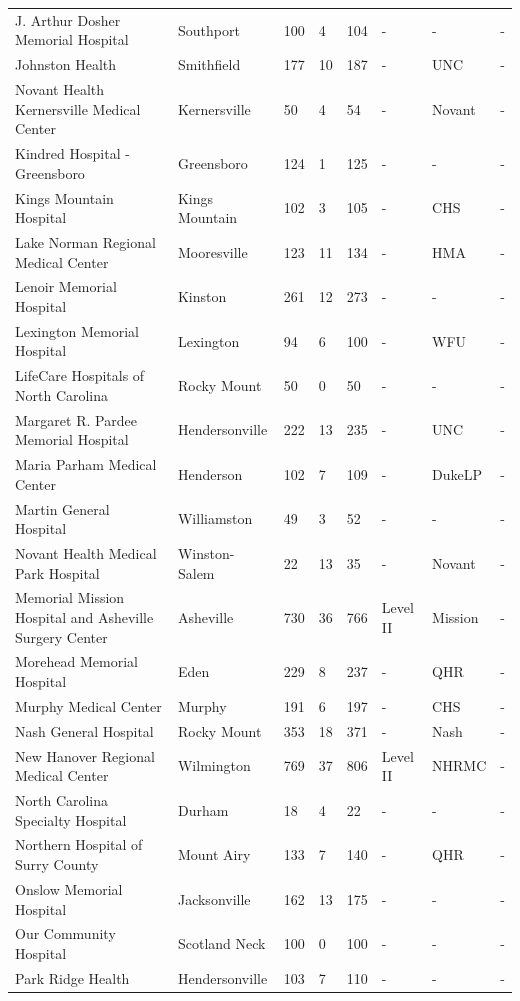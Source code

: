 \documentclass{article}
\begin{document}
\begin{tabular}{llllllll}
J. Arthur Dosher Memorial Hospital & Southport & 100 & 4 & 104 & - & - & - \\
Johnston Health & Smithfield & 177 & 10 & 187 & - & UNC & - \\
Novant Health Kernersville Medical Center & Kernersville & 50 & 4 & 54 & - & Novant & - \\
Kindred Hospital - Greensboro & Greensboro & 124 & 1 & 125 & - & - & - \\
Kings Mountain Hospital & Kings Mountain & 102 & 3 & 105 & - & CHS & - \\
Lake Norman Regional Medical Center & Mooresville & 123 & 11 & 134 & - & HMA & - \\
Lenoir Memorial Hospital & Kinston & 261 & 12 & 273 & - & - & - \\
Lexington Memorial Hospital & Lexington & 94 & 6 & 100 & - & WFU & - \\
LifeCare Hospitals of North Carolina & Rocky Mount & 50 & 0 & 50 & - & - & - \\
Margaret R. Pardee Memorial Hospital & Hendersonville & 222 & 13 & 235 & - & UNC & - \\
Maria Parham Medical Center & Henderson & 102 & 7 & 109 & - & DukeLP & - \\
Martin General Hospital & Williamston & 49 & 3 & 52 & - & - & - \\
Novant Health Medical Park Hospital & Winston-Salem & 22 & 13 & 35 & - & Novant & - \\
Memorial Mission Hospital and Asheville Surgery Center & Asheville & 730 & 36 & 766 & Level II & Mission & - \\
Morehead Memorial Hospital & Eden & 229 & 8 & 237 & - & QHR & - \\
Murphy Medical Center & Murphy & 191 & 6 & 197 & - & CHS & - \\
Nash General Hospital & Rocky Mount & 353 & 18 & 371 & - & Nash & - \\
New Hanover Regional Medical Center & Wilmington & 769 & 37 & 806 & Level II & NHRMC & - \\
North Carolina Specialty Hospital & Durham & 18 & 4 & 22 & - & - & - \\
Northern Hospital of Surry County & Mount Airy & 133 & 7 & 140 & - & QHR & - \\
Onslow Memorial Hospital & Jacksonville & 162 & 13 & 175 & - & - & - \\
Our Community Hospital & Scotland Neck & 100 & 0 & 100 & - & - & - \\
Park Ridge Health & Hendersonville & 103 & 7 & 110 & - & - & - \\

\end{tabular}
\end{document}
